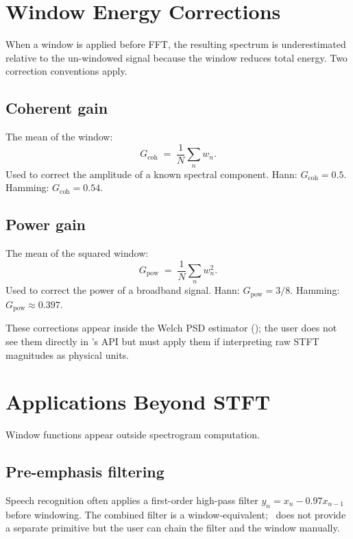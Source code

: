 \section{Window Energy Corrections}
\label{sec:signal_windows:energy_corrections}

When a window is applied before FFT, the resulting spectrum is
underestimated relative to the un-windowed signal because the
window reduces total energy. Two correction conventions apply.

\subsection{Coherent gain}
\label{ssec:signal_windows:coherent_gain}

The mean of the window:
\[
G_{\mathrm{coh}} \;=\; \frac{1}{N} \sum_n w_n.
\]
Used to correct the amplitude of a known spectral component.
Hann: $G_{\mathrm{coh}} = 0.5$. Hamming: $G_{\mathrm{coh}} = 0.54$.

\subsection{Power gain}
\label{ssec:signal_windows:power_gain}

The mean of the squared window:
\[
G_{\mathrm{pow}} \;=\; \frac{1}{N} \sum_n w_n^2.
\]
Used to correct the power of a broadband signal. Hann:
$G_{\mathrm{pow}} = 3/8$. Hamming: $G_{\mathrm{pow}} \approx
0.397$.

These corrections appear inside the Welch PSD estimator
(); the user does not see them directly in
\Lucid's API but must apply them if interpreting raw STFT
magnitudes as physical units.

\section{Applications Beyond STFT}
\label{sec:signal_windows:applications}

Window functions appear outside spectrogram computation.

\subsection{Pre-emphasis filtering}
\label{ssec:signal_windows:pre_emphasis}

Speech recognition often applies a first-order high-pass filter
$y_n = x_n - 0.97 x_{n-1}$ before windowing. The
combined filter is a window-equivalent; \Lucid\ does not provide
a separate primitive but the user can chain the filter and the
window manually.

